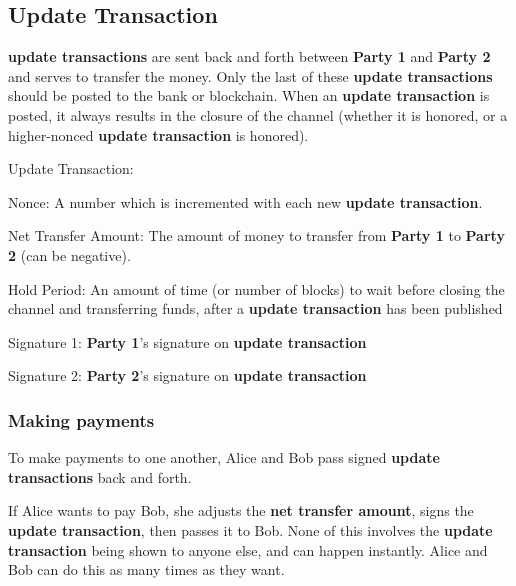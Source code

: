 \documentclass[a4paper]{article}
\newcommand{\bgls}[1]{\textbf{\gls{#1}}}
\newcommand{\bglspl}[1]{\textbf{\glspl{#1}}}
\newenvironment{mydescription}
{\begin{description}
\setlength{\itemsep}{5pt}
  \setlength{\parskip}{0pt}
  \setlength{\labelsep}{5pt}
}{
\end{description}}
\begin{document}
\subsection{Update Transaction}

\bglspl{update transaction} are sent back and forth between \textbf{Party 1} and \textbf{Party 2} and serves to transfer the money. Only the last of these \bglspl{update transaction} should be posted to the bank or blockchain. When an \bgls{update transaction} is posted, it always results in the closure of the channel (whether it is honored, or a higher-nonced \bgls{update transaction} is honored).

\begin{mdframed}[style=message]
\begin{mydescription}
  \item[Update Transaction:] \hfill
    \begin{mydescription}
      \item[Nonce:] A number which is incremented with each new \bgls{update transaction}.
      \item[Net Transfer Amount:] The amount of money to transfer from \textbf{Party 1} to \textbf{Party 2} (can be negative).
      \item[Hold Period:] An amount of time (or number of blocks) to wait before closing the channel and transferring funds, after a \bgls{update transaction} has been published
    \end{mydescription}
  \item[Signature 1:] \textbf{Party 1}'s signature on \bgls{update transaction}
  \item[Signature 2:] \textbf{Party 2}'s signature on \bgls{update transaction}
\end{mydescription}
\end{mdframed}

\subsubsection{Making payments}

To make payments to one another, Alice and Bob pass signed \bglspl{update transaction} back and forth.

If Alice wants to pay Bob, she adjusts the \bgls{net transfer amount}, signs the \bgls{update transaction}, then passes it to Bob. None of this involves the \bgls{update transaction} being shown to anyone else, and can happen instantly. Alice and Bob can do this as many times as they want.
\end{document}
